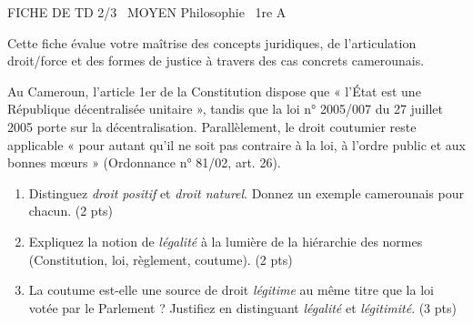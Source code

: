 \documentclass[11pt]{article}
\begin{document}
\begin{tcolorbox}[enhanced,colback=popink,colframe=popink,arc=10pt,boxrule=0pt,left=12pt,right=12pt,top=9pt,bottom=9pt]
{\color{white}\popxbold\small FICHE DE TD 2/3 \textbullet\ MOYEN \hfill Philosophie \textbullet\ 1re A\par}
\end{tcolorbox}
\vspace{4pt}
Cette fiche évalue votre maîtrise des concepts juridiques, de l'articulation droit/force et des formes de justice à travers des cas concrets camerounais.

\begin{exercice}
Au Cameroun, l'article 1er de la Constitution dispose que « l'État est une République décentralisée unitaire », tandis que la loi n° 2005/007 du 27 juillet 2005 porte sur la décentralisation. Parallèlement, le droit coutumier reste applicable « pour autant qu'il ne soit pas contraire à la loi, à l'ordre public et aux bonnes mœurs » (Ordonnance n° 81/02, art. 26).
\begin{enumerate}
    \item Distinguez \textit{droit positif} et \textit{droit naturel}. Donnez un exemple camerounais pour chacun. (2 pts)
    \item Expliquez la notion de \textit{légalité} à la lumière de la hiérarchie des normes (Constitution, loi, règlement, coutume). (2 pts)
    \item La coutume est-elle une source de droit \textit{légitime} au même titre que la loi votée par le Parlement ? Justifiez en distinguant \textit{légalité} et \textit{légitimité}. (3 pts)
\end{enumerate}
\end{exercice}
\end{document}
